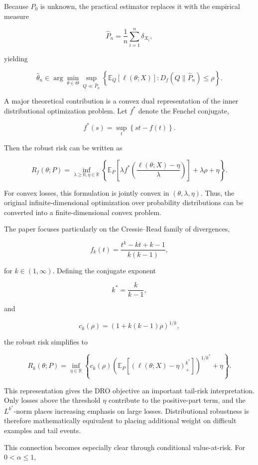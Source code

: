 \documentclass[11pt]{article}
\begin{document}
Because \(P_0\) is unknown, the practical estimator replaces it with the empirical measure

\[
\widehat{P}_n
=
\frac{1}{n}
\sum_{i=1}^{n}
\delta_{X_i},
\]

yielding

\[
\widehat{\theta}_n
\in
\arg\min_{\theta\in\Theta}
\sup_{Q\ll\widehat{P}_n}
\left\{
\mathbb{E}_{Q}
\left[
\ell(\theta;X)
\right]
:
D_f(Q\|\widehat{P}_n)\leq\rho
\right\}.
\]

A major theoretical contribution is a convex dual representation of the inner distributional optimization problem. Let \(f^*\) denote the Fenchel conjugate,

\[
f^*(s)
=
\sup_t
\left\{
st-f(t)
\right\}.
\]

Then the robust risk can be written as

\[
R_f(\theta;P)
=
\inf_{\lambda\geq 0,\eta\in\mathbb{R}}
\left\{
\mathbb{E}_{P}
\left[
\lambda
f^*
\left(
\frac{\ell(\theta;X)-\eta}{\lambda}
\right)
\right]
+
\lambda\rho
+
\eta
\right\}.
\]

For convex losses, this formulation is jointly convex in \((\theta,\lambda,\eta)\). Thus, the original infinite-dimensional optimization over probability distributions can be converted into a finite-dimensional convex problem.

The paper focuses particularly on the Cressie--Read family of divergences,

\[
f_k(t)
=
\frac{
t^k-kt+k-1
}{
k(k-1)
},
\]

for \(k\in(1,\infty)\). Defining the conjugate exponent

\[
k^*
=
\frac{k}{k-1},
\]

and

\[
c_k(\rho)
=
\left(
1+k(k-1)\rho
\right)^{1/k},
\]

the robust risk simplifies to

\[
R_k(\theta;P)
=
\inf_{\eta\in\mathbb{R}}
\left\{
c_k(\rho)
\left(
\mathbb{E}_{P}
\left[
\left(
\ell(\theta;X)-\eta
\right)_+^{k^*}
\right]
\right)^{1/k^*}
+
\eta
\right\}.
\]

This representation gives the DRO objective an important tail-risk interpretation. Only losses above the threshold \(\eta\) contribute to the positive-part term, and the \(L^{k^*}\)-norm places increasing emphasis on large losses. Distributional robustness is therefore mathematically equivalent to placing additional weight on difficult examples and tail events.

This connection becomes especially clear through conditional value-at-risk. For \(0<\alpha\leq1\),
\end{document}
